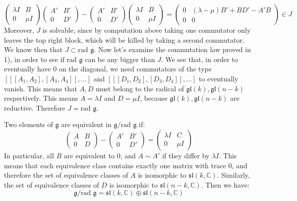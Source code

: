 \documentclass[12 pt]{article}
\newcommand{\C}{\mathbb{C}}
\newcommand{\fr}{\mathfrak}
\begin{document}
\[    \left(\begin{array}{cc}\lambda I & B \\ 0 & \mu I\end{array}\right)  \left(\begin{array}{cc}A' & B' \\ 0 & D'\end{array}\right) - \left(\begin{array}{cc}A' & B' \\ 0 & D'\end{array}\right) \left(\begin{array}{cc}\lambda I & B \\ 0 & \mu I\end{array}\right)  =  \left(\begin{array}{cc}0  & (\lambda- \mu) B' + BD' - A'B \\ 0 & 0\end{array}\right) \in J \]
Moreover, $J$ is solvable, since by computation above taking one commutator only leaves the top right block, which will be killed by taking a second commutator. We know then that $J \subset \text{rad } \fr g$. Now let's examine the commutation law proved in 1), in order to see if $\text{rad } \fr g$ can be any bigger than $J$. We see that, in order to eventually have 0 on the diagonal, we need commutators of the type $[[[A_1,A_2], [A_3,A_4]], \dots]$ and $[[[D_1,D_2], [D_3,D_4]], \dots]$ to eventually vanish. This means that $A,D$ must belong to the radical of $\fr {gl}(k), \fr {gl}(n-k)$ respectively. This means $A = \lambda I$ and $D = \mu I$, because $\fr {gl}(k), \fr {gl}(n-k)$ are reductive. Therefore $J = \text{rad } \fr g$.

Two elements of $\fr g$ are equivalent in $\fr g / \text{rad } \fr g$ if:
\[          \left(\begin{array}{cc}A & B \\ 0 & D\end{array}\right) -  \left(\begin{array}{cc}A' & B' \\ 0 & D'\end{array}\right) =  \left(\begin{array}{cc}\lambda I & C \\ 0 & \mu I \end{array}\right)        \]
In particular, all $B$ are equivalent to $0$, and $A \sim A'$ if they differ by $\lambda I$. This means that each equivalence class contains exactly one matrix with trace 0, and therefore the set of equivalence classes of $A$ is isomorphic to $\fr{sl}(k,\C)$. Similarly, the set of equivalence classes of $D$ is isomorphic to $\fr{sl}(n-k, \C)$. Then we have:
\[      \fr g / \text{rad } \fr g =   \fr{sl}(k,\C) \oplus  \fr{sl}(n-k, \C)     \]
\end{document}
